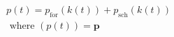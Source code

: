 \begin{equation}
\begin{split}
	p(t) = p_\text{for}(k(t)) + p_\text{sch}(k(t))\\
	\text{ where } (p(t)) = \textbf{p}
\end{split}
\label{ch2:equ:notation-simplification}
\end{equation}